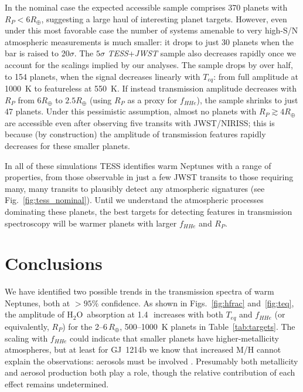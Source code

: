 \documentclass[twocolumn]{aastex61}
\newcommand{\water}{H$_2$O}
\begin{document}
In the nominal case the expected accessible sample comprises 370
planets with $R_P<6R_\oplus$, suggesting a large haul of interesting
planet targets. However, even under this most favorable case the
number of systems amenable to very high-S/N atmospheric measurements
is much smaller: it drops to just 30 planets when the bar is raised to
20$\sigma$. The $5\sigma$ {\em TESS}+{\em JWST} sample also decreases
rapidly once we account for the scalings implied by our analyses. The
sample drops by over half, to 154 planets, when the signal decreases
linearly with $T_{eq}$: from full amplitude at 1000~K to featureless
at 550~K. If instead transmission amplitude decreases with $R_P$ from
$6R_\oplus$ to $2.5R_\oplus$ (using $R_P$ as a proxy for $f_{HHe}$),
the sample shrinks to just 47 planets. Under this pessimistic
assumption, almost no planets with $R_P\gtrsim4 R_\oplus$ are
accessible even after observing five transits with JWST/NIRISS; this
is because (by construction) the amplitude of transmission features
rapidly decreases for these smaller planets.

In all of these simulations TESS identifies warm Neptunes with a range
of properties, from those observable in just a few JWST transits to
those requiring many, many transits to plausibly detect any
atmospheric signatures (see Fig.~\ref{fig:tess_nominal}).  Until we
understand the atmospheric processes dominating these planets, the
best targets for detecting features in transmission spectroscopy will
be warmer planets with larger $f_{HHe}$ and $R_P$.

\section{Conclusions}
\label{sec:conclusion}
We have identified two possible trends in the transmission spectra of
warm Neptunes, both at $>95\%$ confidence. As shown in
Figs.~\ref{fig:hfrac} and~\ref{fig:teq}, the amplitude of
\water\ absorption at 1.4\,\micron\ increases with both $T_{eq}$ and
$f_{HHe}$ (or equivalently, $R_P$) for the 2--6\,$R_\oplus$,
500--1000~K planets in Table~\ref{tab:targets}.  The scaling with
$f_{HHe}$ could indicate that smaller planets have higher-metallicity
atmospheres, but at least for GJ~1214b we know that increased M/H
cannot explain the observations: aerosols must be involved
\citep{kreidberg:2014}. Presumably both metallicity and aerosol
production both play a role, though the relative contribution of each
effect remains undetermined.

\end{document}
